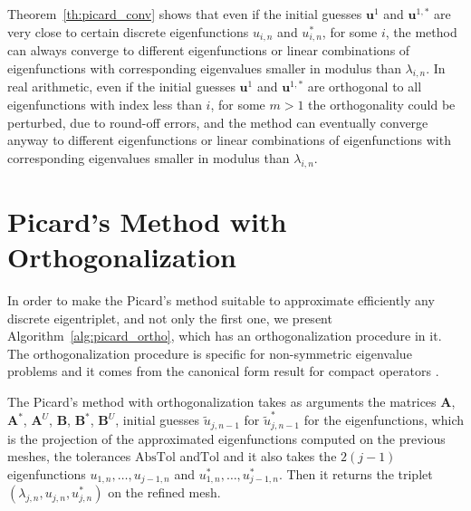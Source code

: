 \documentclass[smallextended]{svjour3}
\begin{document}
\noindent
Theorem~\ref{th:picard_conv} shows that even if the initial guesses $\mathbf{u}^1$ and $\mathbf{u}^{1,*}$ are very close to 
certain discrete eigenfunctions $u_{i,n}$ and $u_{i,n}^*$, for some $i$, the method can always converge to different 
eigenfunctions or linear combinations of eigenfunctions with corresponding eigenvalues smaller in modulus than 
$\lambda_{i,n}$. In real arithmetic, even if the initial guesses $\mathbf{u}^1$ and $\mathbf{u}^{1,*}$ are 
orthogonal to all eigenfunctions with index less than $i$, for some $m>1$ the orthogonality could be perturbed, 
due to round-off errors, and the method can eventually converge anyway to different eigenfunctions or linear 
combinations of eigenfunctions with corresponding eigenvalues smaller in modulus than $\lambda_{i,n}$.





\section{Picard's Method with Orthogonalization}\label{sec:picard++}

In order to make the Picard's method suitable to approximate efficiently any discrete eigentriplet, 
and not only the first one, we present Algorithm~\ref{alg:picard_ortho}, which has an orthogonalization 
procedure in it. The orthogonalization procedure is specific for non-symmetric eigenvalue problems 
and it comes from the canonical form result for compact operators \cite[Theorem~9.17]{Hislop}.

The Picard's method with orthogonalization takes as arguments the matrices $\mathbf{A}$, $\mathbf{A}^*$, $\mathbf{A}^U$, $\mathbf{B}$, $\mathbf{B}^*$, $\mathbf{B}^U$,  initial guesses $\tilde u_{j,n-1}$ for $\tilde u_{j,n-1}^*$ for the eigenfunctions, which is the projection of the approximated eigenfunctions computed on the previous meshes, the tolerances  $\mathrm{AbsTol}$ and$\mathrm{Tol}$ and it also takes the $2(j-1)$ eigenfunctions $u_{1,n},\dots,u_{j-1,n}$ and  $u_{1,n}^*,\dots,u_{j-1,n}^*$.
Then it returns the triplet $(\lambda_{j,n},u_{j,n},u_{j,n}^*)$ on the refined mesh.
\end{document}
